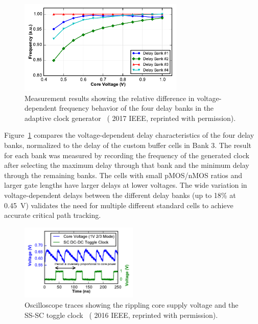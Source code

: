 \documentclass[graybox]{svmult}
\begin{document}
\begin{figure}
  \centering
  \includegraphics[width=0.7\textwidth]{6-raven4-clockgen-trc}
  \caption{Measurement results showing the relative difference in voltage-dependent frequency behavior of the four delay banks in the adaptive clock generator~\cite{Keller2017, reprinted with permission} ({\textcopyright} 2017 IEEE, reprinted with permission).}
  \label{fig:6-raven4-clockgen-trc}
\end{figure}

Figure~\ref{fig:6-raven4-clockgen-trc} compares the voltage-dependent delay characteristics of the four delay banks, normalized to the delay of the custom buffer cells in Bank 3.
The result for each bank was measured by recording the frequency of the generated clock after selecting the maximum delay through that bank and the minimum delay through the remaining banks.
The cells with small pMOS/nMOS ratios and larger gate lengths have larger delays at lower voltages.
The wide variation in voltage-dependent delays between the different delay banks (up to 18\% at \SI{0.45}{\volt}) validates the need for multiple different standard cells to achieve accurate critical path tracking.

\begin{figure}
  \centering
  \includegraphics[width=0.5\textwidth]{6-raven4-waveforms-powermeas}
  \caption{Oscilloscope traces showing the rippling core supply voltage and the SS-SC toggle clock~\cite{Keller2016} ({\textcopyright} 2016 IEEE, reprinted with permission).}
  \label{fig:6-raven4-waveforms-powermeas}
\end{figure}
\end{document}
